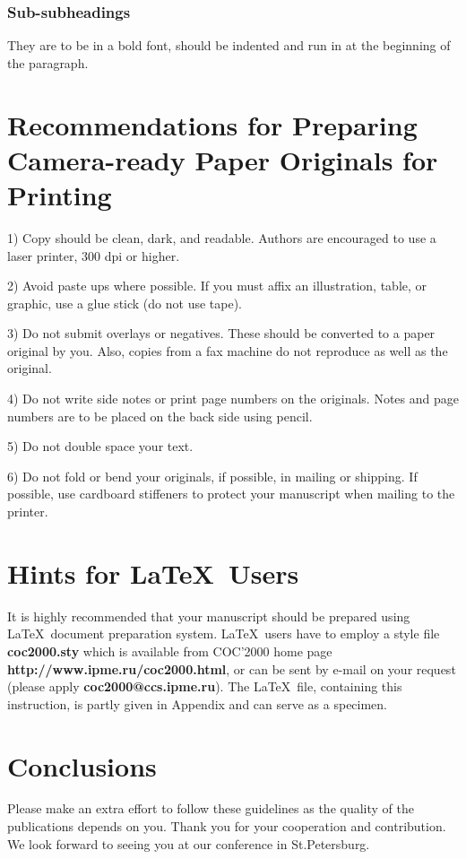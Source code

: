 \subsubsection{Sub-subheadings} They are to be in a bold font,
should be indented and run in at the beginning of the paragraph.


\section{Recommendations for Preparing Camera-ready Paper
Originals for Printing}

1) Copy should be clean, dark, and readable.
Authors are encouraged to use a laser printer,
300 dpi or higher.

2) Avoid paste ups where possible.
If you must affix an illustration, table, or graphic,
use a glue stick (do not use tape).

3) Do not submit overlays or negatives.
These should be converted to a paper original by you.
Also, copies from a fax machine do not reproduce as well as the original.

4) Do not write side notes or print page numbers on the originals.
Notes and page numbers are to be placed on the back side using pencil.

5) Do not double space your text.

6) Do not fold or bend your originals, if possible,
in mailing or shipping.
If possible, use cardboard stiffeners to protect your
manuscript when mailing to the printer.


\section{Hints for \LaTeX~Users}

It is highly recommended that your manuscript should be
prepared using \LaTeX~document preparation system.
\LaTeX~users have to employ a style file {\bf coc2000.sty}
which is available from COC'2000 home page
{\bf http://www.ipme.ru/coc2000.html},
or can be sent
by e-mail on your request (please apply
{\bf  coc2000@ccs.ipme.ru}).
The \LaTeX~file, containing this instruction, is partly
given in Appendix and can serve as a specimen.

\section{Conclusions}

Please make an extra effort to follow these guidelines
as the quality of the publications depends on you.
Thank you for your cooperation and contribution.
We look forward to seeing you at our conference in
St.Petersburg.

